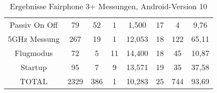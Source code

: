 \begin{landscape}
\begin{table}[h!]
\begin{tabular}{|c|c|c|c|c|c|c|c|}
      Passiv On Off & \phantom{00}79 & \phantom{0}52 & \phantom{0}1 & \phantom{0}1,500 & 17 & \phantom{00}4 & \phantom{00}9,76 \\
      5GHz Messung & \phantom{0}267 & \phantom{0}19 & \phantom{0}1 & 12,053 & 18 & 122 & \phantom{0}65,11 \\
      Flugmodus & \phantom{00}72 & \phantom{00}5 & 11 & 14,400 & 18 & \phantom{0}45 & \phantom{0}10,87 \\
      Startup & \phantom{00}95 & \phantom{00}7 & \phantom{0}9 & 13,571 & 19 & \phantom{0}35 & \phantom{0}37,58 \\
      \hline 
      TOTAL & 2329 & 386 & \phantom{0}1 & 10,283 & 25 & 744 & \phantom{0}93,69 \\
      \hline
      \end{tabular}
      \caption{Ergebnisse Fairphone 3+ Messungen, Android-Version 10
      \label{table:fairphone3-10-results}} 
   \end{table}

   \clearpage
         
\end{landscape}

